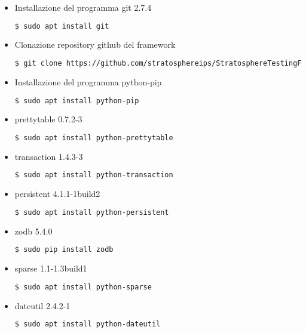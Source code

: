 \documentclass[../main.tex]{subfiles}
\begin{document}
\begin{itemize}
				\item Installazione del programma git 2.7.4
\begin{lstlisting}[language=bash]
$ sudo apt install git
\end{lstlisting}

				\item Clonazione repository github del framework
\begin{lstlisting}[language=bash]
$ git clone https://github.com/stratosphereips/StratosphereTestingFramework
\end{lstlisting}

				\item Installazione del programma python-pip
\begin{lstlisting}[language=bash]
$ sudo apt install python-pip
\end{lstlisting}
\end{itemize}
				
\begin{itemize}
				\paragraph{Installazione dipendenze per Stratosphere IPS}

				\item prettytable 0.7.2-3
\begin{lstlisting}[language=bash]
$ sudo apt install python-prettytable
\end{lstlisting}

				\item transaction 1.4.3-3
\begin{lstlisting}[language=bash]
$ sudo apt install python-transaction
\end{lstlisting}

				\item persistent 4.1.1-1build2
\begin{lstlisting}[language=bash]
$ sudo apt install python-persistent
\end{lstlisting}

				\item zodb 5.4.0
\begin{lstlisting}[language=bash]
$ sudo pip install zodb
\end{lstlisting}

				\item sparse 1.1-1.3build1
\begin{lstlisting}[language=bash]
$ sudo apt install python-sparse
\end{lstlisting}

				\item dateutil 2.4.2-1
\begin{lstlisting}[language=bash]
$ sudo apt install python-dateutil
\end{lstlisting}


\end{itemize}
\end{document}
